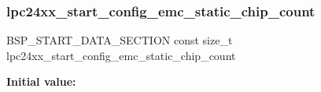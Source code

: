 \subsubsection{\texorpdfstring{lpc24xx\_start\_config\_emc\_static\_chip\_count}{lpc24xx\_start\_config\_emc\_static\_chip\_count}}
{\footnotesize\ttfamily B\+S\+P\+\_\+\+S\+T\+A\+R\+T\+\_\+\+D\+A\+T\+A\+\_\+\+S\+E\+C\+T\+I\+ON const size\+\_\+t lpc24xx\+\_\+start\+\_\+config\+\_\+emc\+\_\+static\+\_\+chip\+\_\+count}

{\bfseries Initial value\+:}
\begin{DoxyCode}{0}
\DoxyCodeLine{=}

\end{DoxyCode}
